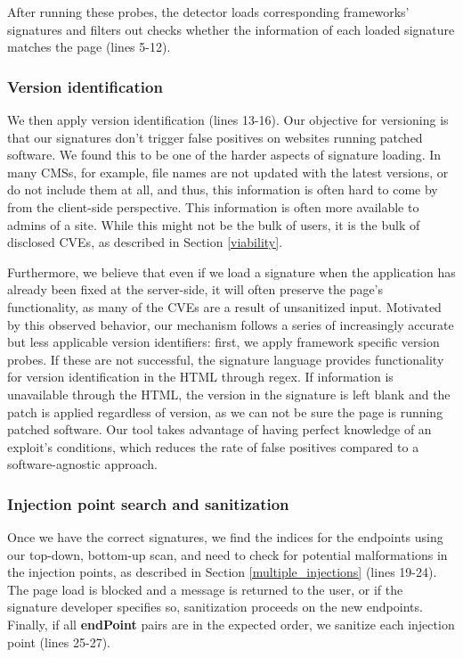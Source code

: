 After running these probes, the detector loads corresponding frameworks' signatures and filters out checks whether the information of each loaded signature matches the page (lines 5-12).

\subsubsection{Version identification} \label{versioning}
We then apply version identification (lines 13-16). Our objective for versioning is that our signatures don't trigger false positives on websites running patched software. We found this to be one of the harder aspects of signature loading. In many \acp{CMS}, for example, file names are not updated with the latest versions, or do not include them at all, and thus, this information is often hard to come by from the client-side perspective. This information is often more available to admins of a site. While this might not be the bulk of users, it is the bulk of disclosed CVEs, as described in Section \ref{viability}.

Furthermore, we believe that even if we load a signature when the application has already been fixed at the server-side, it will often preserve the page's functionality, as many of the CVEs are a result of unsanitized input. Motivated by this observed behavior, our mechanism follows a series of increasingly accurate but less applicable version identifiers: first, we apply framework specific version probes. If these are not successful, the signature language provides functionality for version identification in the HTML through regex. If information is unavailable through the HTML, the version in the signature is left blank and the patch is applied regardless of version, as we can not be sure the page is running patched software. Our tool takes advantage of having perfect knowledge of an exploit's conditions, which reduces the rate of false positives compared to a software-agnostic approach.

\subsubsection{Injection point search and sanitization} \label{search_and_sanitization}
Once we have the correct signatures, we find the indices for the endpoints using our top-down, bottom-up scan, and need to check for potential malformations in the injection points, as described in Section \ref{multiple_injections} (lines 19-24). The page load is blocked and a message is returned to the user, or if the signature developer specifies so, sanitization proceeds on the new endpoints. Finally, if all \textbf{endPoint} pairs are in the expected order, we sanitize each injection point (lines 25-27).


